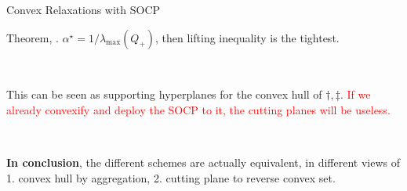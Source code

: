 \documentclass[aspectratio=1610, 10pt]{beamer}
\newcommand{\red}[1]{\textcolor{red}{#1}}
\begin{document}
\begin{frame}[allowframebreaks]{Convex Relaxations with SOCP}
\begin{enumerate}
  \end{enumerate}

  \framebreak

  Theorem, \cite{bienstock_cutting-planes_2014}. \(\alpha^\star = 1/\lambda_{\max} (Q_+)\), then lifting inequality is the tightest.

  \

  This can be seen as supporting hyperplanes for the convex hull of \(\dagger, \ddagger\). \red{If we already convexify and deploy the SOCP to it, the cutting planes will be useless.}

  \

  \textbf{In conclusion},
  the different schemes are actually equivalent, in different views of 1. convex hull by aggregation, 2. cutting plane to reverse convex set.
  \framebreak

\end{frame}
\end{document}
